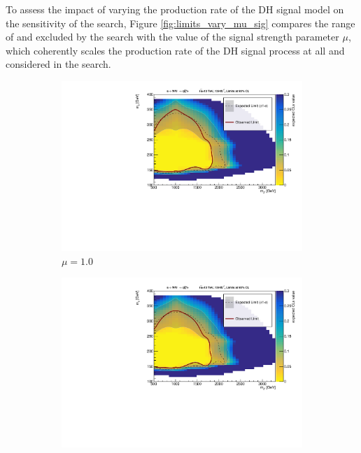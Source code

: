 \label{chapter:appendix_mu_sig}

To assess the impact of varying the production rate of the DH signal model on the sensitivity of the search, Figure \ref{fig:limits_vary_mu_sig} compares the range of \ms and \mZp excluded by the search with the value of the signal strength parameter \(\mu\), which coherently scales the production rate of the DH signal process at all \ms and \mZp considered in the search. 

\begin{figure}[h]
  \centering
  \begin{subfigure}{0.48\textwidth}
    \includegraphics[width=\textwidth]{Figures/8/unblinded_nosig.pdf}
    \caption{\(\mu=1.0\)}\label{fig:unblinded_mu1}
  \end{subfigure} \hspace{0.3em}
  \begin{subfigure}{0.48\textwidth}
    \includegraphics[width=\textwidth]{Figures/App_signal_strength/unblinded_mu0_95_nosig.pdf}

\end{subfigure}
\end{figure}
